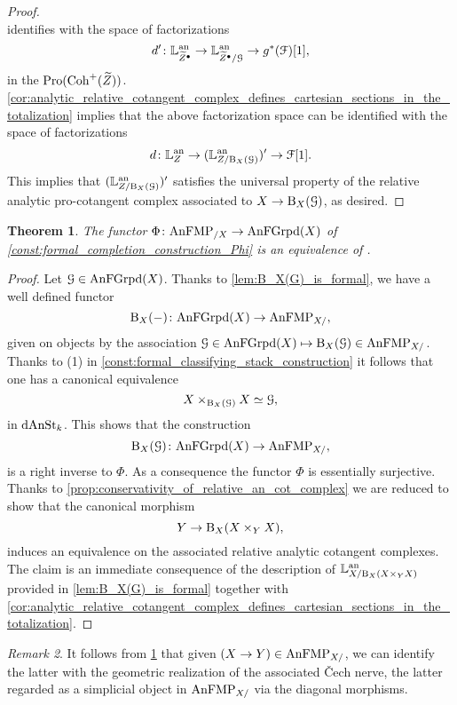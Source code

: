 \documentclass[10pt,a4paper,reqno]{amsart} %
\theoremstyle{plain}
\newtheorem{thm}{Theorem}[section]
\theoremstyle{definition}
\theoremstyle{remark}
\newtheorem{rem}[thm]{Remark}
\numberwithin{equation}{section}
\begin{document}
\begin{proof}
\[        \]
    identifies with the space of factorizations
        \[
            d' \colon \mathbb L^\mathrm{an}_{\widetilde Z^\bullet} \to \mathbb L^\mathrm{an}_{\widetilde Z^\bullet/ \mathcal G} \to g^*(\mathcal F)[1],
        \]  
    in the \infcat $\mathrm{Pro}(\mathrm{Coh}^+(\widetilde Z))$. \cref{cor:analytic_relative_cotangent_complex_defines_cartesian_sections_in_the_totalization} implies that the above factorization space can be identified with the space
    of factorizations
        \[
            d \colon \mathbb L^\mathrm{an}_Z \to (\mathbb L^{\mathrm{an}}_{Z/ \mathrm B_X(\mathcal G)})' \to \mathcal F[1].
        \]
    This implies that $(\mathbb L^{\mathrm{an}}_{Z/ \mathrm B_X(\mathcal G)})'$ satisfies the universal property of the relative analytic pro-cotangent complex
    associated to $X \to \mathrm B_X(\mathcal G)$, as desired.
\end{proof}

\begin{thm} \label{thm:Phi_is_an_equivalence}
    The functor $\Phi \colon \mathrm{AnFMP}_{/X} \to \mathrm{AnFGrpd}(X)$ of \cref{const:formal_completion_construction_Phi} is an equivalence of \infcats.
\end{thm}

\begin{proof} Let $\mathcal G \in \mathrm{AnFGrpd}(X)$. Thanks to \cref{lem:B_X(G)_is_formal}, we have a well defined functor
        \[
            \mathrm B_X(-) \colon \mathrm{AnFGrpd}(X) \to \mathrm{AnFMP}_{X/ },  
        \]
    given on objects by the association $\mathcal G \in \mathrm{AnFGrpd}(X) \mapsto \mathrm B_X(\mathcal G) \in \mathrm{AnFMP}_{X/ }$.
    Thanks to (1) in \cref{const:formal_classifying_stack_construction} it follows that one has a canonical equivalence
        \[
            X \times_{\mathrm B_X(\mathcal G)} X \simeq \mathcal G,
        \]
    in $\mathrm{dAnSt}_k$. This shows that the construction
        \[
            \mathrm B_X(\mathcal G) \colon \mathrm{AnFGrpd}(X) \to \mathrm{AnFMP}_{X/},  
        \]
    is a right inverse to $\Phi$. As a consequence the functor $\Phi$ is essentially surjective. Thanks to \cref{prop:conservativity_of_relative_an_cot_complex}
    we are reduced to show that the canonical morphism
        \[
            Y \to \mathrm B_X(X \times_Y X),  
        \]
    induces an equivalence on the associated relative analytic cotangent complexes. The claim is an immediate consequence of
    the description of $\mathbb L^\mathrm{an}_{X/ \mathrm B_X(X \times_Y X)}$ provided in \cref{lem:B_X(G)_is_formal} together with
    \cref{cor:analytic_relative_cotangent_complex_defines_cartesian_sections_in_the_totalization}.
\end{proof}

\begin{rem}
    It follows from \cref{thm:Phi_is_an_equivalence} that given $(X \to Y) \in \mathrm{AnFMP}_{X/ }$, we can identify the latter with the
    geometric realization of the associated \v{C}ech nerve, the latter regarded as a simplicial object in $\mathrm{AnFMP}_{X/ }$ via the
    diagonal morphisms.
\end{rem}
\end{document}
